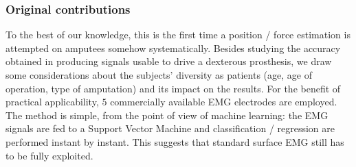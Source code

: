 \subsubsection{Original contributions}

To the best of our knowledge, this is the first time a position / force estimation
is attempted on amputees somehow systematically. Besides studying the accuracy
obtained in producing signals usable to drive a dexterous prosthesis, we draw some
considerations about the subjects' diversity
as patients (age, age of operation, type of amputation) and its impact on the results.
For the benefit of practical applicability, $5$ commercially available EMG electrodes are
employed. The method is simple, from the point of view of machine learning: 
the EMG signals are fed to a Support Vector Machine and classification / regression
are performed instant by instant. This suggests that standard surface EMG still has
to be fully exploited.
